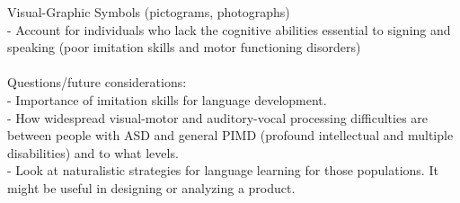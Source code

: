 \documentclass{article}
\begin{document}
	Visual-Graphic Symbols (pictograms, photographs) \\
	- Account for individuals who lack the cognitive abilities essential to signing and speaking (poor imitation skills and motor functioning disorders) \\
	\\
	
	Questions/future considerations:\\
	- Importance of imitation skills for language development.\\
	- How widespread visual-motor and auditory-vocal processing difficulties are between people with ASD and general PIMD (profound intellectual and multiple disabilities) and to what levels.\\
	- Look at naturalistic strategies for language learning for those populations. It might be useful in designing or analyzing a product.\\
	
	
\end{document}

